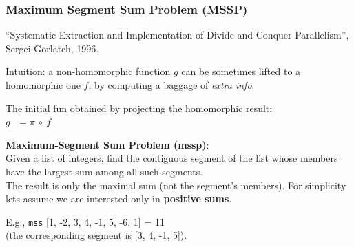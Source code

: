\documentclass{beamer}
\renewcommand{\emph}[1]{\textcolor{structure}{#1}}
\newcommand{\emp}[1]{\textcolor{DikuRed}{ #1}}
\begin{document}
\begin{frame}[fragile,t]
  \frametitle{Maximum Segment Sum Problem (MSSP)}

\emp{``Systematic Extraction and Implementation of Divide-and-Conquer Parallelism'', Sergei Gorlatch, 1996.} 
\bigskip

\emph{Intuition}: a non-homomorphic function $g$ can be sometimes lifted 
to a homomorphic one $f$, by computing a baggage of \emp{\em extra info}. 

\bigskip

The initial fun obtained by projecting the homomorphic result:\\
$g\mbox{ }=\pi~\circ~f$

\bigskip

\emp{\bf Maximum-Segment Sum Problem ({\sc mssp})}: \\
Given a list of integers, find the contiguous segment of the list 
whose members have the largest sum among all such segments.\\
The result is only the maximal sum (not the segment's members).
For simplicity lets assume we are interested only in {\bf positive sums}.

\bigskip

E.g., {\tt mss} [1, -2, 3, 4, -1, 5, -6, 1] = 11 \\
(the corresponding segment is [3, 4, -1, 5]). 

\end{frame}
\end{document}
